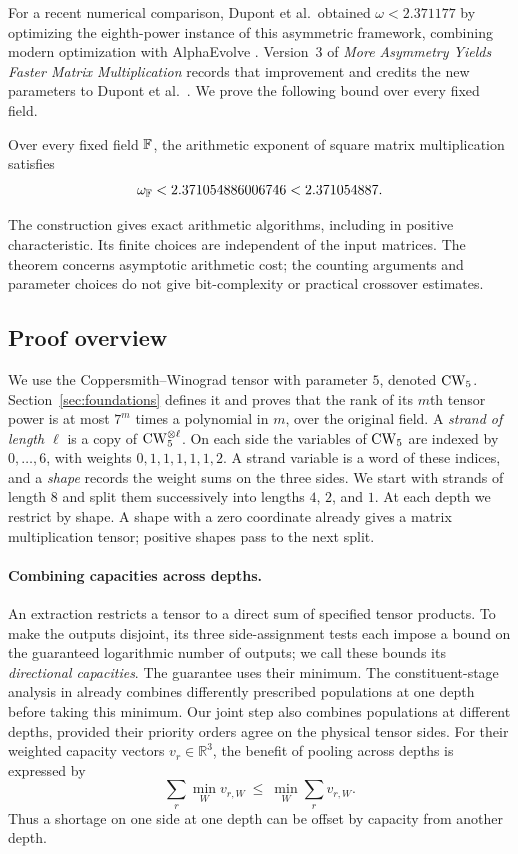 For a recent numerical comparison, Dupont et al.\ obtained
$\omega<2.371177$ by optimizing the eighth-power instance of this
asymmetric framework, combining modern optimization with AlphaEvolve
\cite{Dupont2026}.  Version~3 of \emph{More Asymmetry Yields Faster
Matrix Multiplication} records that improvement and credits the new
parameters to Dupont et al.\ \cite[Table~1]{MoreAsymmetry2026}.
We prove the following bound over every fixed field.

\begin{theorem}\label{thm:main}
Over every fixed field $\mathbb F$, the arithmetic exponent of square matrix
multiplication satisfies
\[
 \omega_\mathbb F<2.371054886006746<2.371054887.
\]
\end{theorem}

The construction gives exact arithmetic algorithms, including in positive
characteristic.  Its finite choices are independent of the input matrices.
The theorem concerns asymptotic arithmetic cost; the counting arguments
and parameter choices do not give bit-complexity or practical crossover
estimates.

\subsection{Proof overview}

We use the Coppersmith--Winograd tensor with parameter $5$, denoted
$\mathrm{CW}_5$.  Section~\ref{sec:foundations} defines it and proves that the
rank of its $m$th tensor power is at most $7^m$ times a polynomial in
$m$, over the original field.  A \emph{strand of length $\ell$} is a
copy of $\mathrm{CW}_5^{\otimes\ell}$.  On each side the variables of $\mathrm{CW}_5$
are indexed by $0,\ldots,6$, with weights $0,1,1,1,1,1,2$.
A strand variable is a word of these indices, and a \emph{shape} records
the weight sums on the three sides.  We start with strands of
length $8$ and split them successively into lengths $4$, $2$, and $1$.
At each depth we restrict by shape.  A shape with a zero coordinate
already gives a matrix multiplication tensor; positive shapes pass to
the next split.

\paragraph{Combining capacities across depths.}
An extraction restricts a tensor to a direct sum of specified tensor
products.  To make the outputs disjoint, its three side-assignment tests
each impose a bound on the guaranteed logarithmic number of outputs;
we call these bounds its \emph{directional capacities}.  The guarantee
uses their minimum.  The constituent-stage analysis in
\cite[Theorem~6.4]{MoreAsymmetry2026} already combines differently
prescribed populations at one depth before taking this minimum.
Our joint step also combines populations at different depths, provided
their priority orders agree on the physical tensor sides.  For their
weighted capacity vectors $v_r\in\mathbb R^3$, the benefit of pooling
across depths is expressed by
\[
 \sum_r\min_W v_{r,W}\ \leq\ \min_W\sum_r v_{r,W}.
\]
Thus a shortage on one side at one depth can be offset by capacity from
another depth.

